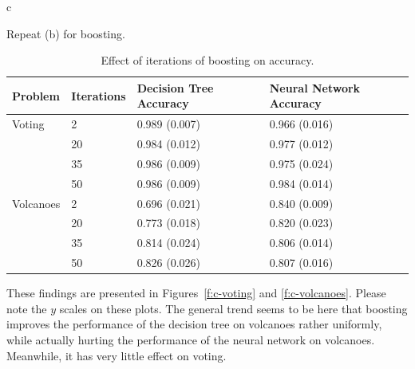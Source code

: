 \documentclass[fleqn]{homework}
\begin{document}
    \FloatBarrier
  \begin{problem}{c}
    \begin{question}
      Repeat (b) for boosting.
    \end{question}
    \FloatBarrier

    \begin{table}[h]
      \centering
      \caption{Effect of iterations of boosting on accuracy.}
      \label{t:c}
      \begin{tabular}{ll|ll}
        \toprule
        Problem   & Iterations & Decision Tree Accuracy & Neural Network Accuracy \\
        \midrule
        Voting    & 2          & 0.989 (0.007)          & 0.966 (0.016)            \\
                  & 20         & 0.984 (0.012)          & 0.977 (0.012)            \\
                  & 35         & 0.986 (0.009)          & 0.975 (0.024)            \\
                  & 50         & 0.986 (0.009)          & 0.984 (0.014)            \\
        \midrule
        Volcanoes & 2          & 0.696 (0.021)          & 0.840 (0.009)            \\
                  & 20         & 0.773 (0.018)          & 0.820 (0.023)            \\
                  & 35         & 0.814 (0.024)          & 0.806 (0.014)            \\
                  & 50         & 0.826 (0.026)          & 0.807 (0.016)            \\
        \bottomrule
      \end{tabular}
    \end{table}

    These findings are presented in Figures~\ref{f:c-voting} and
    \ref{f:c-volcanoes}.  Please note the $y$ scales on these plots.  The
    general trend seems to be here that boosting improves the performance of the
    decision tree on volcanoes rather uniformly, while actually hurting the
    performance of the neural network on volcanoes.  Meanwhile, it has very
    little effect on voting.


\end{problem}
\end{document}
